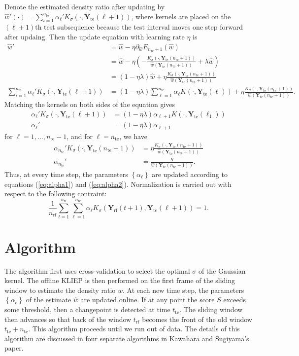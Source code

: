 \documentclass[12pt]{article}
\newcommand\prn[1]{\left( #1 \right)}
\newcommand\set[1]{\left\{ #1 \right\}}
\newcommand\YY{{\boldsymbol{Y}}}
\newcommand\rf{{\mathrm{rf}}}
\newcommand\te{{\mathrm{te}}}
\begin{document}
Denote the estimated density ratio after updating by $\hat w'(\cdot)=\sum_{i=1}^{n_\te}\alpha_\ell'K_\sigma(\cdot,\YY_\te(\ell+1))$, where kernels are placed on the $(\ell+1)$th test subsequence because the test interval moves one step forward after updaing. Then the update equation with learning rate $\eta$ is
\begin{align*}
  \hat w'
  &=\hat w-\eta\partial_{\hat w}E_{n_\te+1}(\hat w)\\
  &=\hat w-\eta\prn{-\frac{K_\sigma(\cdot,\YY_\te(n_\te+1))}{\hat w(\YY_\te(n_\te+1))}+\lambda\hat w}\\
  &=(1-\eta\lambda)\hat w+\eta\frac{K_\sigma(\cdot,\YY_\te(n_\te+1))}{\hat w(\YY_\te(n_\te+1))}\\
  \sum_{i=1}^{n_\te}\alpha_\ell'K_\sigma(\cdot,\YY_\te(\ell+1))
  &=(1-\eta\lambda)\sum_{\ell=1}^{n_\te}\alpha_\ell K(\cdot,\YY_\te(\ell))+\eta\frac{K_\sigma(\cdot,\YY_\te(n_\te+1))}{\hat w(\YY_\te(n_\te+1))}.
\end{align*}
Matching the kernels on both sides of the equation gives
\begin{align}
  \label{eq:alpha1}
  \alpha_\ell'K_\sigma(\cdot,\YY_\te(\ell+1))&=(1-\eta\lambda)\alpha_{\ell+1}K(\cdot,\YY_\te(\ell_1))\nonumber\\
  \alpha_\ell'&=(1-\eta\lambda)\alpha_{\ell+1}
\end{align}
for $\ell=1,\ldots,n_\te-1$, and for $\ell=n_\te$, we have
\begin{align}
  \label{eq:alpha2}
  \alpha_{n_\te}'K_\sigma(\cdot,\YY_\te(n_\te+1))&=\eta\frac{K_\sigma(\cdot,\YY_\te(n_\te+1))}{\hat w(\YY_\te(n_\te+1))}\nonumber\\
  \alpha_{n_\te}'&=\frac{\eta}{\hat w(\YY_\te(n_\te+1))}.
\end{align}
Thus, at every time step, the parameters $\set{\alpha_\ell}$ are updated according to equations (\ref{eq:alpha1}) and (\ref{eq:alpha2}). Normalization is carried out with respect to the following contraint:
$$\frac{1}{n_\rf}\sum_{t=1}^{n_\rf}\sum_{\ell=1}^{n_\te}\alpha_\ell K_\sigma(\YY_\rf(t+1),\YY_\te(\ell+1))=1.$$

\section{Algorithm}

The algorithm first uses cross-validation to select the optimal $\sigma$ of the Gaussian kernel. The offline KLIEP is then performed on the first frame of the sliding window to estimate the density ratio $w$. At each new time step, the parameters $\set{\alpha_\ell}$ of the estimate $\hat w$ are updated online. If at any point the score $S$ exceeds some threshold, then a changepoint is detected at time $t_\te$. The sliding window then advances so that back of the window $t_\rf$ becomes the front of the old window $t_\te+n_\te$. This algorithm proceeds until we run out of data. The details of this algorithm are discussed in four separate algorithms in Kawahara and Sugiyama's paper.



\end{document}
